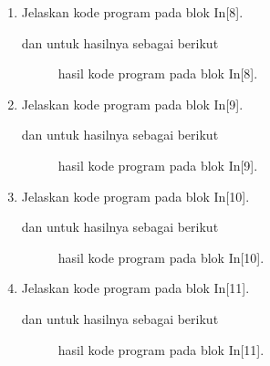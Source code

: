 \begin{enumerate}
\item Jelaskan kode program pada blok  In[8].

dan untuk hasilnya sebagai berikut
\begin{figure}[!htbp]
      \caption{hasil kode program pada blok  In[8].}
      \label{c148}
      \end{figure}

\item Jelaskan kode program pada blok  In[9].

dan untuk hasilnya sebagai berikut
\begin{figure}[!htbp]
      \caption{hasil kode program pada blok  In[9].}
      \label{c149}
      \end{figure}

\item Jelaskan kode program pada blok  In[10].

dan untuk hasilnya sebagai berikut
\begin{figure}[!htbp]
      \caption{hasil kode program pada blok  In[10].}
      \label{c150}
      \end{figure}

\item Jelaskan kode program pada blok  In[11].

dan untuk hasilnya sebagai berikut
\begin{figure}[!htbp]
      \caption{hasil kode program pada blok  In[11].}
      \label{c151}
      \end{figure}


\end{enumerate}
